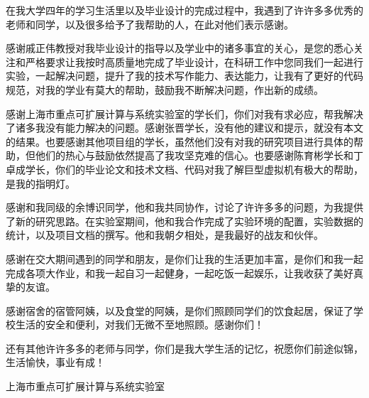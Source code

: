 \begin{thanks}
在我大学四年的学习生活里以及毕业设计的完成过程中，我遇到了许许多多优秀的老师和同学，以及很多给予了我帮助的人，在此对他们表示感谢。

感谢戚正伟教授对我毕业设计的指导以及学业中的诸多事宜的关心，是您的悉心关注和严格要求让我按时高质量地完成了毕业设计，在科研工作中您同我们一起进行实验，一起解决问题，提升了我的技术写作能力、表达能力，让我有了更好的代码规范，对我的学业有莫大的帮助，鼓励我不断解决问题，作出新的成绩。

感谢上海市重点可扩展计算与系统实验室的学长们，你们对我有求必应，帮我解决了诸多我没有能力解决的问题。感谢张晋学长，没有他的建议和提示，就没有本文的结果。也要感谢其他项目组的学长，虽然他们没有对我的研究项目进行具体的帮助，但他们的热心与鼓励依然提高了我攻坚克难的信心。也要感谢陈育彬学长和丁卓成学长，你们的毕业论文和技术文档、代码对我了解巨型虚拟机有极大的帮助，是我的指明灯。

感谢和我同级的余博识同学，他和我共同协作，讨论了许许多多的问题，为我提供了新的研究思路。在实验室期间，他和我合作完成了实验环境的配置，实验数据的统计，以及项目文档的撰写。他和我朝夕相处，是我最好的战友和伙伴。

感谢在交大期间遇到的同学和朋友，是你们让我的生活更加丰富，是你们和我一起完成各项大作业，和我一起自习一起健身，一起吃饭一起娱乐，让我收获了美好真挚的友谊。

感谢宿舍的宿管阿姨，以及食堂的阿姨，是你们照顾同学们的饮食起居，保证了学校生活的安全和便利，对我们无微不至地照顾。感谢你们！

还有其他许许多多的老师与同学，你们是我大学生活的记忆，祝愿你们前途似锦，生活愉快，事业有成！

上海市重点可扩展计算与系统实验室
  

\end{thanks}
